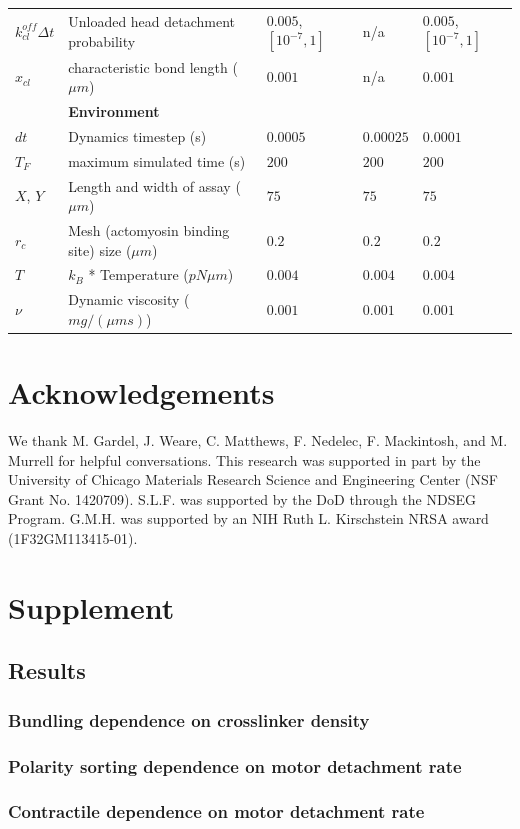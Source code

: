 \documentclass[12pt]{article}
\newcommand{\beginsupplement}{%
  \setcounter{table}{0}
  \renewcommand{\thetable}{S\arabic{table}}%
  \setcounter{figure}{0}
  \renewcommand{\thefigure}{S\arabic{figure}}%
}
\begin{document}
\begin{table}
\begin{tabular}{|C{1cm}|L{7cm}|C{2.3cm}|C{2.3cm}|C{2.3cm}|}
  $k^{off}_{cl} \Delta t$& Unloaded head detachment probability& $0.005$, $[10^{-7},1]$ & n/a & $0.005$, $[10^{-7},1]$\\
    $x_{cl}$& characteristic bond length ($\mu m$) & $0.001$ & n/a & $0.001$ \\
    \hline
    &\bf{Environment} & & & \\
    \hline
    $dt$ & Dynamics timestep (s) & $0.0005$ & $0.00025$ & $0.0001$\\
    $T_F$& maximum simulated time (s) & $200$ & $200$ & $200$ \\
    $X$, $Y$ & Length and width of assay ($\mu m$)& $75$ & $75$ & $75$\\
    $r_c$ & Mesh (actomyosin binding site) size ($\mu m$) & $0.2$ & $0.2$ & $0.2$ \\ 
    $T$ & $k_B$ * Temperature ($pN\mu m$)& $0.004$& $0.004$& $0.004$\\
    $\nu$ & Dynamic viscosity ($mg/(\mu m s)$) & $0.001$& $0.001$& $0.001$\\
    \hline
  \end{tabular}
  \label{tab:params}
\end{table}

\section{Acknowledgements}  
We thank M. Gardel, J. Weare, C. Matthews, F. Nedelec, F. Mackintosh, and M.
Murrell for helpful conversations. This research was supported in part by the
University of Chicago Materials Research Science and Engineering Center
(NSF Grant No. 1420709). S.L.F. was supported by the DoD
through the NDSEG Program. G.M.H. was supported by an NIH Ruth L. Kirschstein
NRSA award (1F32GM113415-01).


\beginsupplement
\section{Supplement}
\subsection{Results}
\subsubsection{Bundling dependence on crosslinker density}
\subsubsection{Polarity sorting dependence on motor detachment rate}
\subsubsection{Contractile dependence on motor detachment rate}
\end{document}
